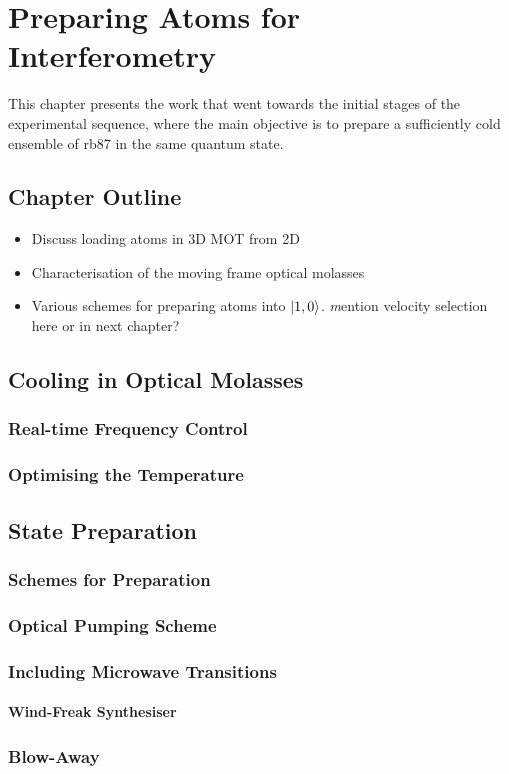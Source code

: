 \chapter{Preparing Atoms for Interferometry}\label{chap:atom_prep}
This chapter presents the work that went towards the initial stages of the experimental sequence, where the main objective is to prepare a sufficiently cold ensemble of \ac{rb87} in the same quantum state.
\section{Chapter Outline}
\begin{itemize}
    \item Discuss loading atoms in 3D MOT from 2D
    \item Characterisation of the moving frame optical molasses
    \item Various schemes for preparing atoms into \(\ket{1,0}\). {\textit mention velocity selection here or in next chapter?}
\end{itemize}

\section{Cooling in Optical Molasses}\label{sec:optical_molasses}
\subsection{Real-time Frequency Control}
\subsection{Optimising the Temperature}

\section{State Preparation}\label{sec:state_prep}
\subsection{Schemes for Preparation}
\subsection{Optical Pumping Scheme} 
\subsection{Including Microwave Transitions}
\subsubsection{Wind-Freak Synthesiser}\label{subsec:windfreak}

\subsection{Blow-Away}\label{subsec:blow_away}